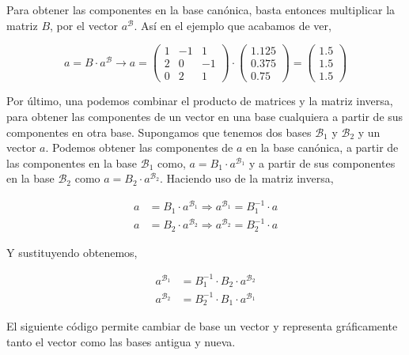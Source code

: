 Para obtener las componentes en la base canónica, basta entonces multiplicar la matriz $B$, por el vector $a^{\mathcal{B}}$. Así en el ejemplo que acabamos de ver,

\begin{equation*}
a=B\cdot a^{\mathcal{B}} \rightarrow a=\begin{pmatrix}
1& -1& 1\\
2& 0& -1\\
0& 2& 1
\end{pmatrix}\cdot \begin{pmatrix}
1.125\\
0.375\\
0.75
\end{pmatrix}
= \begin{pmatrix}
1.5\\
1.5\\
1.5
\end{pmatrix}
\end{equation*}

Por último, una podemos combinar el producto de matrices y la matriz inversa, para obtener las componentes de un vector en una base cualquiera a partir de sus componentes en otra base. Supongamos que tenemos dos bases $\mathcal{B}_1$ y $\mathcal{B}_2$ y un vector $a$. Podemos obtener las componentes de $a$ en la base canónica, a partir de las componentes en la base $\mathcal{B}_1$ como, $a=B_1\cdot a^{\mathcal{B}_1}$ y a partir de sus componentes en la base $\mathcal{B}_2$ como $a=B_2\cdot a^{\mathcal{B}_2}$. Haciendo uso de la matriz inversa,

\begin{align*}
a&=B_1\cdot a^{\mathcal{B}_1} \Rightarrow a^{\mathcal{B}_1}=B_1^{-1} \cdot a \\
 a&=B_2\cdot a^{\mathcal{B}_2} \Rightarrow a^{\mathcal{B}_2}=B_2^{-1} \cdot a
\end{align*}

Y sustituyendo obtenemos,

\begin{align*}
a^{\mathcal{B}_1}&=B_1^{-1}\cdot B_2 \cdot a^{\mathcal{B}_2}\\
a^{\mathcal{B}_2}&=B_2^{-1} \cdot B_1\cdot a^{\mathcal{B}_1} 
\end{align*}

El siguiente código permite cambiar de base un vector y representa gráficamente tanto el vector como las bases antigua y nueva.

